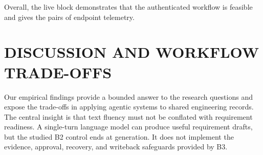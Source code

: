 \documentclass[manuscript,review]{acmart}
\begin{document}
Overall, the live block demonstrates that the authenticated workflow is feasible and gives the pairs of endpoint telemetry.

\FloatBarrier
\section{DISCUSSION AND WORKFLOW TRADE-OFFS}\label{sec:discussion}
Our empirical findings provide a bounded answer to the research questions and expose the trade-offs in applying agentic systems to shared engineering records. The central insight is that text fluency must not be conflated with requirement readiness. A single-turn language model can produce useful requirement drafts, but the studied B2 control ends at generation. It does not implement the evidence, approval, recovery, and writeback safeguards provided by B3.
\end{document}
